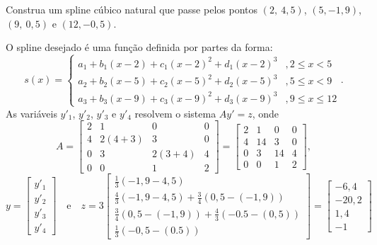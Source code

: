 \begin{ex}Construa um spline cúbico natural que passe pelos pontos $(2,~4,5)$, $(5,-1,9)$, $(9,~0,5)$ e $(12,-0,5)$.
\end{ex}
\begin{sol}
O spline desejado é uma função definida por partes da forma:
\begin{equation}
s(x)=\left\{\begin{array}{ll}
    a_1+b_1(x-2)+c_1(x-2)^2+d_1(x-2)^3 &, 2\leq x <5\\
    a_2+b_2(x-5)+c_2(x-5)^2+d_2(x-5)^3 &, 5\leq x <9\\
    a_3+b_3(x-9)+c_3(x-9)^2+d_3(x-9)^3 &, 9\leq x \leq 12
\end{array}\right..  
\end{equation}
As variáveis $y'_1$, $y'_2$, $y'_3$ e $y'_4$ resolvem o sistema $Ay' = z$, onde
\begin{equation*}
A = \begin{bmatrix}
  2 &1&0&0 \\
  4&2(4+3)&3&0\\
  0&3&2(3+4)&4\\
  0&0&1&2
\end{bmatrix} = \begin{bmatrix}
  2 &1&0&0 \\
  4&14&3&0\\
  0&3&14&4\\
  0&0&1&2
\end{bmatrix}  ,
\end{equation*}
\begin{equation*}
y = \begin{bmatrix}
y'_1\\
y'_2\\
y'_3\\
y'_4
\end{bmatrix} \quad \text{e}\quad
z = 3\begin{bmatrix}
\frac{1}{3}(-1,9-4,5)\\
\frac{4}{3}(-1,9-4,5)+\frac{3}{4}(0,5-(-1,9))\\
\frac{3}{4}(0,5-(-1,9))+\frac{4}{3}(-0.5-(0,5))\\
\frac{1}{3}(-0,5-(0.5))
\end{bmatrix} = \begin{bmatrix}
-6,4\\
-20,2\\
1,4\\
-1
\end{bmatrix}  
\end{equation*}

\end{sol}
